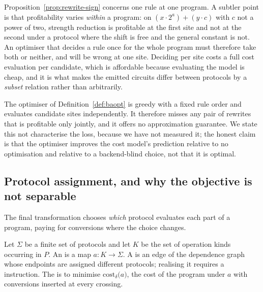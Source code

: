 \begin{remark}
\label{rem:persite}
Proposition~\ref{prop:rewrite-sign} concerns one rule at one program. A subtler
point is that profitability varies \emph{within} a program: on
$(x \cdot 2^a) + (y \cdot c)$ with $c$ not a power of two, strength reduction is
profitable at the first site and not at the second under a protocol where the
shift is free and the general constant is not. An optimiser that decides a rule
once for the whole program must therefore take both or neither, and will be wrong
at one site. Deciding per site costs a full cost evaluation per candidate, which
is affordable because evaluating the model is cheap, and it is what makes the
emitted circuits differ between protocols by a \emph{subset} relation rather than
arbitrarily.
\end{remark}

\begin{remark}
\label{rem:opt-limits}
The optimiser of Definition~\ref{def:baopt} is greedy with a fixed rule order and
evaluates candidate sites independently. It therefore misses any pair of rewrites
that is profitable only jointly, and it offers no approximation guarantee. We
state this not characterise the loss, because we have not measured it; the
honest claim is that the optimiser improves the cost model's prediction relative
to no optimisation and relative to a backend-blind choice, not that it is optimal.
\end{remark}

\subsection{Protocol assignment, and why the objective is not separable}
\label{sec:compiler:assign}

The final transformation chooses \emph{which} protocol evaluates each part of a
program, paying for conversions where the choice changes.

\begin{definition}
\label{def:assignment}
Let $\Sigma$ be a finite set of protocols and let $K$ be the set of operation
kinds occurring in $P$. An  is a map $a : K \to \Sigma$. A
 is an edge of the dependence graph whose endpoints are assigned
different protocols; realising it requires a  instruction. The
 is to minimise
$\mathrm{cost}_{\delta}\bigl(a\bigr)$, the cost of the program under $a$ with
conversions inserted at every crossing.
\end{definition}

